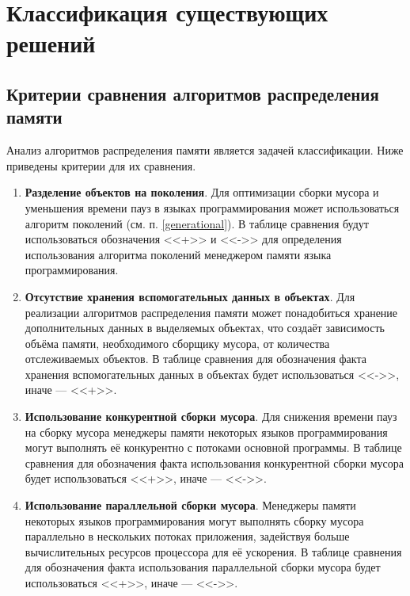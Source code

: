 \chapter{Классификация существующих решений}

\section{Критерии сравнения алгоритмов распределения памяти}

Анализ алгоритмов распределения памяти является задачей классификации. Ниже приведены критерии для их сравнения.

\begin{enumerate}[label*=\arabic*.]
	\item \textbf{Разделение объектов на поколения}. \newline
	Для оптимизации сборки мусора и уменьшения времени пауз в языках программирования может использоваться алгоритм поколений (см. п. \ref{generational}). В таблице сравнения будут использоваться обозначения <<+>> и <<->> для определения использования алгоритма поколений менеджером памяти языка программирования.
	
	\item \textbf{Отсутствие хранения вспомогательных данных в объектах}. \newline
	Для реализации алгоритмов распределения памяти может понадобиться хранение дополнительных данных в выделяемых объектах, что создаёт зависимость объёма памяти, необходимого сборщику мусора, от количества отслеживаемых объектов. В таблице сравнения для обозначения факта хранения вспомогательных данных в объектах будет использоваться <<->>, иначе --- <<+>>.
	
	\item \textbf{Использование конкурентной сборки мусора}. \newline
	Для снижения времени пауз на сборку мусора менеджеры памяти некоторых языков программирования могут выполнять её конкурентно с потоками основной программы. В таблице сравнения для обозначения факта использования конкурентной сборки мусора будет использоваться <<+>>, иначе --- <<->>.
	
	\item \textbf{Использование параллельной сборки мусора}. \newline
	Менеджеры памяти некоторых языков программирования могут выполнять сборку мусора параллельно в нескольких потоках приложения, задействуя больше вычислительных ресурсов процессора для её ускорения. В таблице сравнения для обозначения факта использования параллельной сборки мусора будет использоваться <<+>>, иначе --- <<->>.
	

\end{enumerate}
